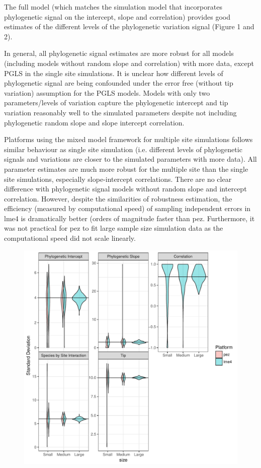 The full model (which matches the simulation model that incorporates phylogenetic signal on the intercept, slope and correlation) provides good estimates of the different levels of the phylogenetic variation signal (Figure 1 and 2).

In general, all phylogenetic signal estimates are more robust for all models (including models without random slope and correlation) with more data, except PGLS in the single site simulations. 
It is unclear how different levels of phylogenetic signal are being confounded under the error free (without tip variation) assumption for the PGLS models.
Models with only two parameters/levels of variation capture the phylogenetic intercept and tip variation reasonably well to the simulated parameters despite not including phylogenetic random slope and slope intercept correlation.

Platforms using the mixed model framework for multiple site simulations follows similar behaviour as single site simulation (i.e. different levels of phylogenetic signals and variations are closer to the simulated parameters with more data). 
All parameter estimates are much more robust for the multiple site than the single site simulations, especially slope-intercept correlations. 
There are no clear difference with phylogenetic signal models without random slope and intercept correlation.
However, despite the similarities of robustness estimation, the efficiency (measured by computational speed) of sampling independent errors in lme4 is dramatically better (orders of magnitude faster than pez.
Furthermore, it was not practical for pez to fit large sample size simulation data as the computational speed did not scale linearly.

\begin{center}
\begin{figure}[h]
\includegraphics[scale=0.8,page=1]{./csplot.pdf}
\end{figure}
\end{center}


